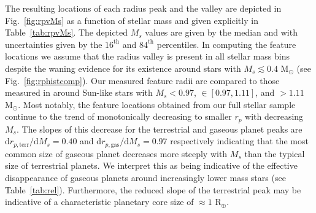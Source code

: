 \documentclass[twocolumn]{emulateapj}
\begin{document}


The resulting locations of each radius peak and the valley are depicted in Fig.~\ref{fig:rpvMs} as a function of
stellar mass and given explicitly in Table~\ref{tab:rpvMs}. The depicted $M_s$ values are given by the median and 
with uncertainties given by the $16^{\text{th}}$ and  $84^{\text{th}}$ percentiles. In computing the
feature locations we assume that the radius valley is present in all stellar mass bins despite the waning
evidence for its existence around stars with $M_s \lesssim 0.4$ M$_{\odot}$ (see Fig.~\ref{fig:rphistcomp}).
Our measured feature radii are compared to those measured in \cite{fulton18} around Sun-like stars with
$M_s <0.97$, $\in [0.97,1.11]$, and $>1.11$ M$_{\odot}$.
Most notably, the feature locations obtained from our full stellar sample continue to the trend of monotonically
decreasing  to smaller $r_p$ with decreasing $M_s$. The slopes of this decrease for the terrestrial and gaseous
planet peaks are $\text{d}r_{p,\text{terr}} / \text{d}M_s = 0.40$ and $\text{d}r_{p,\text{gas}} / \text{d}M_s = 0.97$
respectively indicating that the most common size of
gaseous planet decreases more steeply with $M_s$ than the typical size of terrestrial planets. We interpret this
as being indicative of the effective disappearance of gaseous planets around increasingly lower mass stars
(see Table~\ref{tab:rel}). Furthermore, the reduced slope of the terrestrial peak may be indicative of
a characteristic planetary core size of $\approx 1$ R$_{\oplus}$. 


\end{document}

